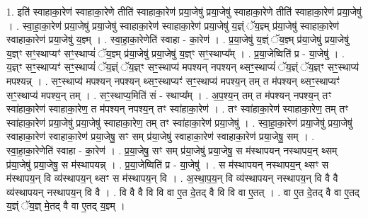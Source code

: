 \documentclass[17pt]{extarticle}
\begin{document}
1. इति॑ स्वाहाका॒रेण॑ स्वाहाका॒रेणे तीति॑ स्वाहाका॒रेण॑ प्रया॒जेषु॑ प्रया॒जेषु॑ स्वाहाका॒रेणे तीति॑ स्वाहाका॒रेण॑ प्रया॒जेषु॑ । . स्वा॒हा॒का॒रेण॑ प्रया॒जेषु॑ प्रया॒जेषु॑ स्वाहाका॒रेण॑ स्वाहाका॒रेण॑ प्रया॒जेषु॑ य॒ज्ञ्ं ॅय॒ज्ञ्म् प्र॑या॒जेषु॑ स्वाहाका॒रेण॑ स्वाहाका॒रेण॑ प्रया॒जेषु॑ य॒ज्ञ्म् । . स्वा॒हा॒का॒रेणेति॑ स्वाहा - का॒रेण॑ । . प्र॒या॒जेषु॑ य॒ज्ञ्ं ॅय॒ज्ञ्म् प्र॑या॒जेषु॑ प्रया॒जेषु॑ य॒ज्ञ्ꣳ सꣳ॒॒स्थाप्यꣳ॑ सꣳ॒॒स्थाप्यं॑ ॅय॒ज्ञ्म् प्र॑या॒जेषु॑ प्रया॒जेषु॑ य॒ज्ञ्ꣳ सꣳ॒॒स्थाप्य᳚म् । . प्र॒या॒जेष्विति॑ प्र - या॒जेषु॑ । . य॒ज्ञ्ꣳ सꣳ॒॒स्थाप्यꣳ॑ सꣳ॒॒स्थाप्यं॑ ॅय॒ज्ञ्ं ॅय॒ज्ञ्ꣳ सꣳ॒॒स्थाप्य॑ मपश्यन् नपश्यन् थ्सꣳ॒॒स्थाप्यं॑ ॅय॒ज्ञ्ं ॅय॒ज्ञ्ꣳ सꣳ॒॒स्थाप्य॑ मपश्यन्न् । . सꣳ॒॒स्थाप्य॑ मपश्यन् नपश्यन् थ्सꣳ॒॒स्थाप्यꣳ॑ सꣳ॒॒स्थाप्य॑ मपश्य॒न् तम् त म॑पश्यन् थ्सꣳ॒॒स्थाप्यꣳ॑ सꣳ॒॒स्थाप्य॑ मपश्य॒न् तम् । . सꣳ॒॒स्थाप्य॒मिति॑ सं - स्थाप्य᳚म् । . अ॒प॒श्य॒न् तम् त म॑पश्यन् नपश्य॒न् तꣳ स्वा॑हाका॒रेण॑ स्वाहाका॒रेण॒ त म॑पश्यन् नपश्य॒न् तꣳ स्वा॑हाका॒रेण॑ । . तꣳ स्वा॑हाका॒रेण॑ स्वाहाका॒रेण॒ तम् तꣳ स्वा॑हाका॒रेण॑ प्रया॒जेषु॑ प्रया॒जेषु॑ स्वाहाका॒रेण॒ तम् तꣳ स्वा॑हाका॒रेण॑ प्रया॒जेषु॑ । . स्वा॒हा॒का॒रेण॑ प्रया॒जेषु॑ प्रया॒जेषु॑ स्वाहाका॒रेण॑ स्वाहाका॒रेण॑ प्रया॒जेषु॒ सꣳ सम् प्र॑या॒जेषु॑ स्वाहाका॒रेण॑ स्वाहाका॒रेण॑ प्रया॒जेषु॒ सम् । . स्वा॒हा॒का॒रेणेति॑ स्वाहा - का॒रेण॑ । . प्र॒या॒जेषु॒ सꣳ सम् प्र॑या॒जेषु॑ प्रया॒जेषु॒ स म॑स्थापयन् नस्थापय॒न् थ्सम् प्र॑या॒जेषु॑ प्रया॒जेषु॒ स म॑स्थापयन्न् । . प्र॒या॒जेष्विति॑ प्र - या॒जेषु॑ । . स म॑स्थापयन् नस्थापय॒न् थ्सꣳ स म॑स्थापय॒न् वि व्य॑स्थापय॒न् थ्सꣳ स म॑स्थापय॒न् वि । . अ॒स्था॒प॒य॒न् वि व्य॑स्थापयन् नस्थापय॒न् वि वै वै व्य॑स्थापयन् नस्थापय॒न् वि वै । . वि वै वै वि वि वा ए॒त दे॒तद् वै वि वि वा ए॒तत् । . वा ए॒त दे॒तद् वै वा ए॒तद् य॒ज्ञ्ं ॅय॒ज्ञ् मे॒तद् वै वा ए॒तद् य॒ज्ञ्म् । \newline
\end{document}

